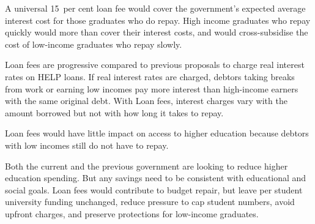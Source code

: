 \documentclass[embargoed]{grattan}
\begin{document}
\begin{overview}
A universal 15~per cent loan fee would cover the government's expected average interest cost for those graduates who do repay.
High income graduates who repay quickly would more than cover their interest costs, and would cross-subsidise the cost of low-income graduates who repay slowly.

\Gls{Loan fees} are progressive compared to previous proposals to charge real interest rates on \gls{HELP} loans.
If real interest rates are charged, debtors taking breaks from work or earning low incomes pay more interest than high-income earners with the same original debt.
With \gls{Loan fees}, interest charges vary with the amount borrowed but not with how long it takes to repay. 

\Gls{Loan fees} would have little impact on access to higher education because debtors with low incomes still do not have to repay.

Both the current and the previous government are looking to reduce higher education spending. But any savings need to be consistent with educational and social goals.
\Gls{Loan fees} would contribute to budget repair, but leave per student university funding unchanged, reduce pressure to cap student numbers, avoid upfront charges, and preserve protections for low-income graduates.
\end{overview}

\contentspage
\listoffigures






\end{document}

